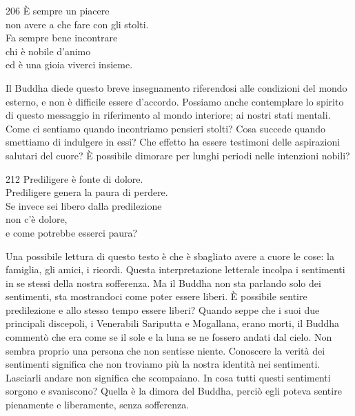 
\begin{dhpVerse}{206}
\label{dhp-206}
È sempre un piacere\\
non avere a che fare con gli stolti.\\
Fa sempre bene incontrare\\
chi è nobile d'animo\\
ed è una gioia viverci insieme.
\end{dhpVerse}

\begin{dhpRefl}
  Il Buddha diede questo breve insegnamento riferendosi alle condizioni del
  mondo esterno, e non è difficile essere d'accordo. Possiamo anche contemplare
  lo spirito di questo messaggio in riferimento al mondo interiore; ai nostri
  stati mentali. Come ci sentiamo quando incontriamo pensieri stolti? Cosa
  succede quando smettiamo di indulgere in essi? Che effetto ha essere testimoni
  delle aspirazioni salutari del cuore? È possibile dimorare per lunghi periodi
  nelle intenzioni nobili?
\end{dhpRefl}


\begin{dhpVerse}{212}
\label{dhp-212}
Prediligere è fonte di dolore.\\
Prediligere genera la paura di perdere.\\
Se invece sei libero dalla predilezione\\
non c'è dolore,\\
e come potrebbe esserci paura?
\end{dhpVerse}

\begin{dhpRefl}
  Una possibile lettura di questo testo è che è sbagliato avere a cuore le cose:
  la famiglia, gli amici, i ricordi. Questa interpretazione letterale incolpa i
  sentimenti in se stessi della nostra sofferenza. Ma il Buddha non sta parlando
  solo dei sentimenti, sta mostrandoci come poter essere liberi. È possibile
  sentire predilezione e allo stesso tempo essere liberi? Quando seppe che i
  suoi due principali discepoli, i Venerabili Sariputta e Mogallana, erano
  morti, il Buddha commentò che era come se il sole e la luna se ne fossero
  andati dal cielo. Non sembra proprio una persona che non sentisse niente.
  Conoscere la verità dei sentimenti significa che non troviamo più la nostra
  identità nei sentimenti. Lasciarli andare non significa che scompaiano. In
  cosa tutti questi sentimenti sorgono e svaniscono? Quella è la dimora del
  Buddha, perciò egli poteva sentire pienamente e liberamente, senza sofferenza.
\end{dhpRefl}

